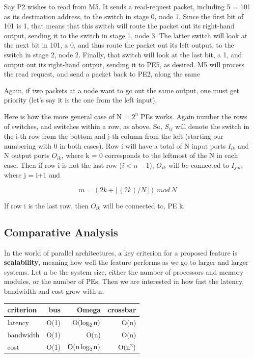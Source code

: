Say P2 wishes to read from M5. It sends a read-request packet, including
5 = 101 as its destination address, to the switch in stage 0, node 1.
Since the first bit of 101 is 1, that means that this switch will route
the packet out its right-hand output, sending it to the switch in stage
1, node 3. The latter switch will look at the next bit in 101, a 0, and
thus route the packet out its left output, to the switch in stage 2,
node 2. Finally, that switch will look at the last bit, a 1, and output
out its right-hand output, sending it to PE5, as desired. M5 will
process the read request, and send a packet back to PE2, along the same

Again, if two packets at a node want to go out the same output, one must
get priority (let's say it is the one from the left input).

Here is how the more general case of N = \( 2^{n} \) PEs works. Again
number the rows of switches, and switches within a row, as above. So, \(
S_{ij} \) will denote the switch in the i-th row from the bottom and
j-th column from the left (starting our numbering with 0 in both cases).
Row i will have a total of N input ports \( I_{ik} \) and N output ports
\( O_{ik} \), where k = 0 corresponds to the leftmost of the N in each
case. Then if row i is not the last row (\( i<n-1 \)), \( O_{ik} \) will
be connected to \( I_{jm} \), where j = i+1 and

\begin{equation}
m = (2k + \lfloor (2k)/N \rfloor ) ~ mod ~ N
\end{equation}

If row i is the last row, then \( O_{ik} \) will be connected to, PE k.


\subsection{Comparative Analysis}

In the world of parallel architectures, a key criterion for a proposed
feature is \textbf{scalability}, meaning how well the feature performs
as we go to larger and larger systems. Let n be the system size, either
the number of processors and memory modules, or the number of PEs. Then
we are interested in how fast the latency, bandwidth and cost grow with
n:

\begin{tabular}{|l|r|r|r|}
\hline
criterion &
 bus &
 Omega&
 crossbar \\
\hline
latency &
 O(1) &
 $\rm O( \log_2 n)$ &
 O(n) \\
\hline
bandwidth &
 O(1) &
 O(n) &
 O(n) \\
\hline
cost &
 O(1) &
 $\rm O(n \log_2 n)$ &
$\rm  O(n^2)$ \\
\hline
\end{tabular}

